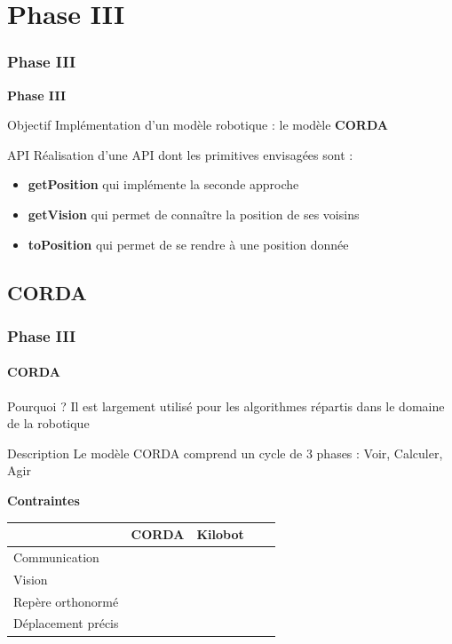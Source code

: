 \documentclass[xcolor=table]{beamer}
\begin{document}
\section{Phase III}
\begin{frame}
  \frametitle{Phase III}
  \begin{center}
    \Huge \textbf{Phase III}
  \end{center}
  \begin{block}{Objectif}
    Implémentation d'un modèle robotique : le modèle \textbf{CORDA}
  \end{block}
  \pause
  \begin{block}{API}
    Réalisation d'une API dont les primitives envisagées sont : \\
    \begin{itemize}
      [triangle]
    \item \textbf{getPosition} qui implémente la seconde approche \pause
    \item \textbf{getVision} qui permet de conna\^itre la position de ses voisins \pause
    \item \textbf{toPosition} qui permet de se rendre à une position donnée
    \end{itemize}
  \end{block}
\end{frame}

\subsection{CORDA}
\begin{frame}
  \frametitle{Phase III}
  \framesubtitle{CORDA}
  \begin{block}{Pourquoi ?}
    Il est largement utilisé pour les algorithmes répartis dans le domaine de la robotique
  \end{block}
  \begin{block}{Description}
    Le modèle CORDA comprend un cycle de 3 phases : Voir, Calculer, Agir
  \end{block}
  \medskip
  \textbf{Contraintes}
  \begin{center}
    \begin{tabular}{l!{\vrule}cccc} 
      & CORDA & Kilobot \\ \hline 
      Communication     & \color{red}     & \color{green} \\ 
      Vision            & \color{green}   & \color{red}   \\ 
      Repère orthonormé & \color{green}   & \color{red}   \\
      Déplacement précis& \color{green}   & \color{red}
    \end{tabular}
  \end{center}
\end{frame}
\end{document}
